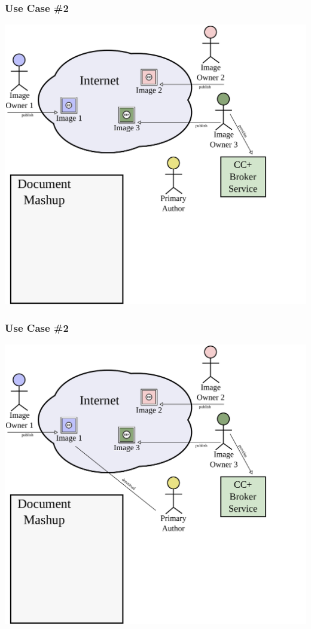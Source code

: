 \documentclass[mathserif,xcolor=dvipsnames,hyperref={bookmarks=true}]{beamer}
\begin{document}
    \begin{frame}[t]
        \frametitle{Use Case \#2}
        \begin{center}
            \includegraphics[width=0.9\textheight]{../resources/usecases/usecase2/usecase2-step14.pdf}
        \end{center}
    \end{frame}
    \begin{frame}[t]
        \frametitle{Use Case \#2}
        \begin{center}
            \includegraphics[width=0.9\textheight]{../resources/usecases/usecase2/usecase2-step15.pdf}
        \end{center}
    \end{frame}
\end{document}
